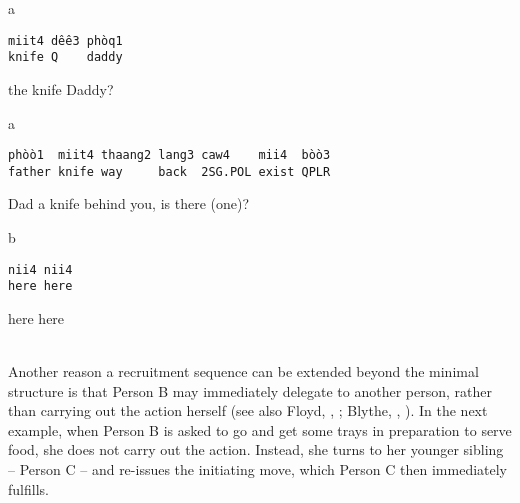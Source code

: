\documentclass[output=paper]{langsci/langscibook}
\begin{document}
\vspace{-1mm}
%
\begin{mdframednoverticalspace}[style=firstfoc]
\begin{transbox}{1}{a}
\begin{verbatim}
miit4 dêê3 phòq1
knife Q    daddy
\end{verbatim}
the knife Daddy?
\end{transbox}
\end{mdframednoverticalspace}
%
%
\begin{mdframednoverticalspace}[style=firstfoc]
\begin{transbox}{3}{a}
\begin{verbatim}
phòò1  miit4 thaang2 lang3 caw4    mii4  bòò3
father knife way     back  2SG.POL exist QPLR
\end{verbatim}
Dad a knife behind you, is there (one)?
\end{transbox}
\end{mdframednoverticalspace}
%
\begin{mdframednoverticalspace}[style=secondfoc]
\begin{transbox}{4}{b}
\begin{verbatim}
nii4 nii4
here here
\end{verbatim}
here here 
\end{transbox}
\end{mdframednoverticalspace}
%
\\

Another reason a recruitment sequence can be extended beyond the minimal structure is that Person B may immediately delegate to another person, rather than carrying out the action herself (see also Floyd, , ; Blythe, , ). In the next example, when Person B is asked to go and get some trays in preparation to serve food, she does not carry out the action. Instead, she turns to her younger sibling -- Person C -- and re-issues the initiating move, which Person C then immediately fulfills.
\end{document}
